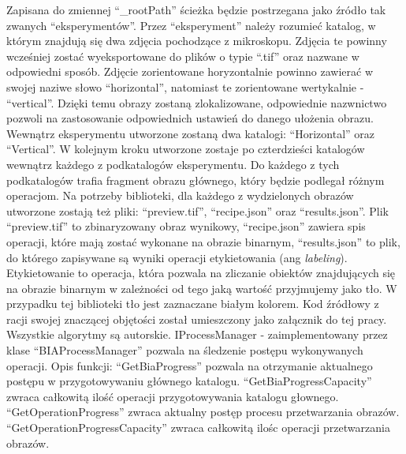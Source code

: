 \documentclass{article}
\begin{document}
{            Zapisana do zmiennej ``\_rootPath'' ścieżka będzie postrzegana jako źródło tak zwanych ``eksperymentów''.
            Przez ``eksperyment'' należy rozumieć katalog, w którym znajdują się dwa zdjęcia pochodzące z mikroskopu.
            Zdjęcia te powinny wcześniej zostać wyeksportowane do plików o typie ``.tif'' oraz nazwane w odpowiedni sposób.
            Zdjęcie zorientowane horyzontalnie powinno zawierać w swojej naziwe słowo ``horizontal'', natomiast te zorientowane wertykalnie - ``vertical''.
            Dzięki temu obrazy zostaną zlokalizowane, odpowiednie nazwnictwo pozwoli na zastosowanie odpowiednich ustawień do danego ułożenia obrazu.
            Wewnątrz eksperymentu utworzone zostaną dwa katalogi: ``Horizontal'' oraz ``Vertical''.
            W kolejnym kroku utworzone zostaje po czterdzieści katalogów wewnątrz każdego z podkatalogów eksperymentu.
            Do każdego z tych podkatalogów trafia fragment obrazu głównego, który będzie podlegał różnym operacjom.
            Na potrzeby biblioteki, dla każdego z wydzielonych obrazów utworzone zostają też pliki: ``preview.tif'', ``recipe.json'' oraz ``results.json''.
            Plik ``preview.tif'' to zbinaryzowany obraz wynikowy, ``recipe.json'' zawiera spis operacji, które mają zostać wykonane na obrazie binarnym, ``results.json'' to plik, do którego zapisywane są wyniki operacji etykietowania (ang \emph{labeling}).
            Etykietowanie to operacja, która pozwala na zliczanie obiektów znajdujących się na obrazie binarnym w zależności od tego jaką wartość przyjmujemy jako tło.
            W przypadku tej biblioteki tło jest zaznaczane białym kolorem.
            Kod źródłowy z racji swojej znaczącej objętości został umieszczony jako załącznik do tej pracy.
            Wszystkie algorytmy są autorskie.
            }
            \newline\newline
            {
                \label{iprocessmanager}
                \Large
                \justifying
                \quad
                IProcessManager - zaimplementowany przez klase ``BIAProcessManager'' pozwala na śledzenie postępu wykonywanych operacji.
                Opis funkcji: ``GetBiaProgress'' pozwala na otrzymanie aktualnego postępu w przygotowywaniu głównego katalogu.
                ``GetBiaProgressCapacity'' zwraca całkowitą ilość operacji przygotowywania katalogu głownego.
                ``GetOperationProgress'' zwraca aktualny postęp procesu przetwarzania obrazów.
                ``GetOperationProgressCapacity'' zwraca całkowitą ilośc operacji przetwarzania obrazów.
            }
\end{document}
